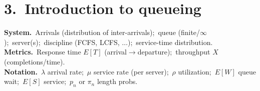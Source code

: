 \section*{3.\ Introduction to queueing}
\textbf{System.}\ Arrivals (distribution of inter-arrivals);\ queue (finite/$\infty$);\ server(s);\ discipline (FCFS, LCFS, $\ldots$);\ service-time distribution.\\
\textbf{Metrics.}\ Response time $E[T]$ (arrival$\to$departure);\ throughput $X$ (completions/time).\\
\textbf{Notation.}\ $\lambda$ arrival rate;\ $\mu$ service rate (per server);\ $\rho$ utilization;\ $E[W]$ queue wait;\ $E[S]$ service;\ $p_n$ or $\pi_n$ length probs.
